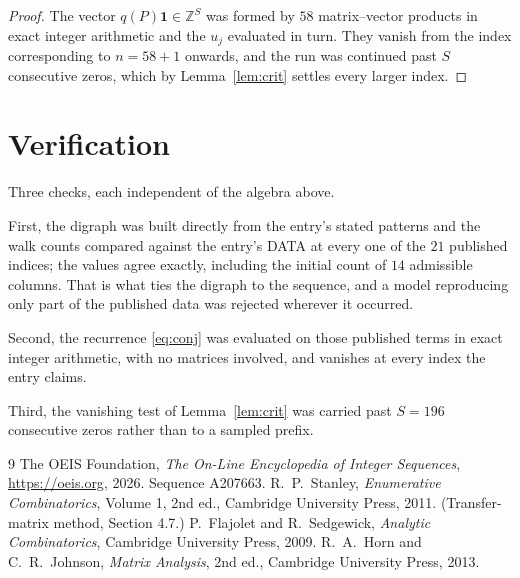 \documentclass[11pt,a4paper]{article}
\theoremstyle{plain}
\theoremstyle{definition}
\begin{document}
\begin{proof}
The vector $q(P)\mathbf{1}\in\mathbb{Z}^{S}$ was formed by $58$ matrix--vector
products in exact integer arithmetic and the $u_j$ evaluated in turn. They vanish from the
index corresponding to $n=58+1$ onwards, and the run was continued past $S$ consecutive
zeros, which by Lemma~\ref{lem:crit} settles every larger index.
\end{proof}

\section{Verification}

Three checks, each independent of the algebra above.

First, the digraph was built directly from the entry's stated patterns and the walk counts
compared against the entry's DATA at every one of the $21$ published indices; the
values agree exactly, including the initial count of $14$ admissible columns. That is
what ties the digraph to the sequence, and a model reproducing only part of the published
data was rejected wherever it occurred.

Second, the recurrence \eqref{eq:conj} was evaluated on those published terms in exact
integer arithmetic, with no matrices involved, and vanishes at every index the entry claims.

Third, the vanishing test of Lemma~\ref{lem:crit} was carried past $S=196$ consecutive
zeros rather than to a sampled prefix.

\begin{thebibliography}{9}
 The OEIS Foundation, \emph{The On-Line Encyclopedia of Integer
Sequences}, \url{https://oeis.org}, 2026. Sequence A207663.
 R.~P.~Stanley, \emph{Enumerative Combinatorics}, Volume 1, 2nd ed.,
Cambridge University Press, 2011. (Transfer-matrix method, Section 4.7.)
 P.~Flajolet and R.~Sedgewick, \emph{Analytic Combinatorics}, Cambridge
University Press, 2009.
 R.~A.~Horn and C.~R.~Johnson, \emph{Matrix Analysis}, 2nd ed., Cambridge
University Press, 2013.
\end{thebibliography}
\end{document}
